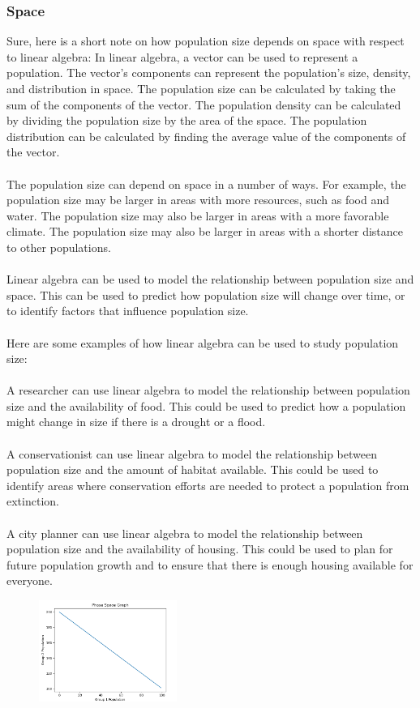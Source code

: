 \documentclass[12pt]{article}
\begin{document}
\subsubsection{Space}
Sure, here is a short note on how population size depends on space with respect to linear algebra:
In linear algebra, a vector can be used to represent a population. The vector's components can represent the population's size, density, and distribution in space. The population size can be calculated by taking the sum of the components of the vector. The population density can be calculated by dividing the population size by the area of the space. The population distribution can be calculated by finding the average value of the components of the vector.\\\\
The population size can depend on space in a number of ways. For example, the population size may be larger in areas with more resources, such as food and water. The population size may also be larger in areas with a more favorable climate. The population size may also be larger in areas with a shorter distance to other populations.\\\\
Linear algebra can be used to model the relationship between population size and space. This can be used to predict how population size will change over time, or to identify factors that influence population size.\\\\
Here are some examples of how linear algebra can be used to study population size:\\\\
A researcher can use linear algebra to model the relationship between population size and the availability of food. This could be used to predict how a population might change in size if there is a drought or a flood.\\\\
A conservationist can use linear algebra to model the relationship between population size and the amount of habitat available. This could be used to identify areas where conservation efforts are needed to protect a population from extinction.\\\\
A city planner can use linear algebra to model the relationship between population size and the availability of housing. This could be used to plan for future population growth and to ensure that there is enough housing available for everyone.
\begin{figure}[H]
  \centering
  \includegraphics[width=0.4\textwidth]{spacefinal.png}
\end{figure}
\end{document}
